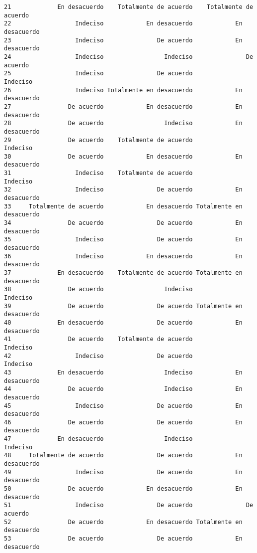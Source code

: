\documentclass[
  letterpaper,
  DIV=11,
  numbers=noendperiod]{scrartcl}
\begin{document}
\begin{verbatim}
21             En desacuerdo    Totalmente de acuerdo    Totalmente de acuerdo
22                  Indeciso            En desacuerdo            En desacuerdo
23                  Indeciso               De acuerdo            En desacuerdo
24                  Indeciso                 Indeciso               De acuerdo
25                  Indeciso               De acuerdo                 Indeciso
26                  Indeciso Totalmente en desacuerdo            En desacuerdo
27                De acuerdo            En desacuerdo            En desacuerdo
28                De acuerdo                 Indeciso            En desacuerdo
29                De acuerdo    Totalmente de acuerdo                 Indeciso
30                De acuerdo            En desacuerdo            En desacuerdo
31                  Indeciso    Totalmente de acuerdo                 Indeciso
32                  Indeciso               De acuerdo            En desacuerdo
33     Totalmente de acuerdo            En desacuerdo Totalmente en desacuerdo
34                De acuerdo               De acuerdo            En desacuerdo
35                  Indeciso               De acuerdo            En desacuerdo
36                  Indeciso            En desacuerdo            En desacuerdo
37             En desacuerdo    Totalmente de acuerdo Totalmente en desacuerdo
38                De acuerdo                 Indeciso                 Indeciso
39                De acuerdo               De acuerdo Totalmente en desacuerdo
40             En desacuerdo               De acuerdo            En desacuerdo
41                De acuerdo    Totalmente de acuerdo                 Indeciso
42                  Indeciso               De acuerdo                 Indeciso
43             En desacuerdo                 Indeciso            En desacuerdo
44                De acuerdo                 Indeciso            En desacuerdo
45                  Indeciso               De acuerdo            En desacuerdo
46                De acuerdo               De acuerdo            En desacuerdo
47             En desacuerdo                 Indeciso                 Indeciso
48     Totalmente de acuerdo               De acuerdo            En desacuerdo
49                  Indeciso               De acuerdo            En desacuerdo
50                De acuerdo            En desacuerdo            En desacuerdo
51                  Indeciso               De acuerdo               De acuerdo
52                De acuerdo            En desacuerdo Totalmente en desacuerdo
53                De acuerdo               De acuerdo            En desacuerdo

\end{verbatim}
\end{document}
